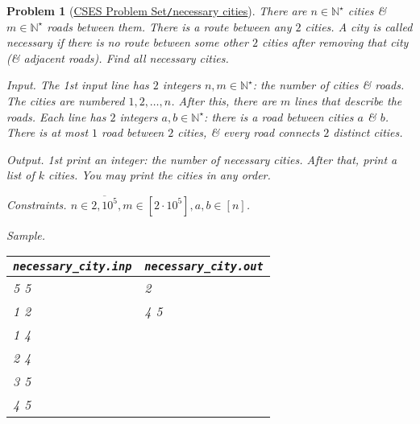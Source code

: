 \documentclass{article}
\newtheorem{problem}{Problem}
\begin{document}
\begin{problem}[\href{https://cses.fi/problemset/task/2077}{CSES Problem Set{\tt/}necessary cities}]
    There are $n\in\mathbb{N}^\star$ cities \& $m\in\mathbb{N}^\star$ roads between them. There is a route between any $2$ cities. A city is called {\rm necessary} if there is no route between some other $2$ cities after removing that city (\& adjacent roads). Find all necessary cities.
    \item {\sf Input.} The 1st input line has $2$ integers $n,m\in\mathbb{N}^\star$: the number of cities \& roads. The cities are numbered $1,2,\ldots,n$. After this, there are $m$ lines that describe the roads. Each line has $2$ integers $a,b\in\mathbb{N}^\star$: there is a road between cities $a$ \& $b$. There is at most $1$ road between $2$ cities, \& every road connects $2$ distinct cities.
    \item {\sf Output.} 1st print an integer: the number of necessary cities. After that, print a list of $k$ cities. You may print the cities in any order.
    \item {\sf Constraints.} $n\in\overline{2,10^5},m\in[2\cdot10^5],a,b\in[n]$.
    \item {\sf Sample.}
    \begin{table}[H]
        \centering
        \begin{tabular}{|l|l|}
            \hline
            \verb|necessary_city.inp| & \verb|necessary_city.out| \\
            \hline
            5 5 & 2 \\
            1 2 & 4 5 \\
            1 4 & \\
            2 4 & \\
            3 5 & \\
            4 5 & \\
            \hline
        \end{tabular}
    \end{table}
\end{problem}
\end{document}
